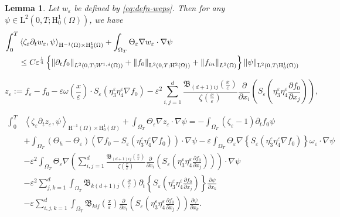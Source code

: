 \documentclass[10pt,a4paper]{amsart}
\newtheorem{lemma}{Lemma}
\newcommand{\eps}{\varepsilon}
\newcommand{\xeps}{\left(\frac{x}{\varepsilon}\right)}
\begin{document}
\begin{lemma}\label{lem:wkform-bound}
Let $w_\eps$ be defined by \eqref{eq:defn-weps}. Then for any $\psi\in\mathrm L^2(0,T;\mathrm H^1_0(\Omega))$, we have
\begin{equation}\label{eq:wkform-bound}
\begin{aligned}
\int_0^T & \left\langle \zeta_\eps\partial_{t}w_{\varepsilon},\psi \right\rangle_{\mathrm{H}^{-1}(\Omega) \times \mathrm{H}_0^1(\Omega)} 
+ \int_{\Omega_T} \Theta_\eps\nabla w_{\varepsilon} \cdot \nabla \psi 
\\
& \le C \eps^{\frac14} \left\{ \left\Vert \partial_tf_0\right\Vert_{L^2(0,T;W^{1,d}(\Omega))} + \left\Vert f_0\right\Vert_{\mathrm L^2(0,T;\mathrm H^2(\Omega))} + \left\Vert f_{{\rm{in}}}\right\Vert_{L^2(\Omega)} \right\}
\left\Vert \psi\right\Vert_{\mathrm L^2(0,T;\mathrm H^1_0(\Omega))}
\end{aligned}
\end{equation}
 \end{lemma}

\begin{equation}\label{eq:defn-zeps}
z_\eps := f_\eps - f_0 
- \eps \omega\left(\frac{x}{\eps}\right)\cdot S_\eps \left( \eta_3^\eps \eta_4^\eps \nabla f_0 \right)
- \eps^2 \sum_{i,j=1}^d \frac{\mathfrak{B}_{(d+1)ij}\xeps}{\zeta\xeps} \frac{\partial}{\partial x_i} \left(S_\eps \left( \eta_3^\eps \eta_4^\eps \frac{\partial f_0}{\partial x_j}\right)\right),
\end{equation}

\begin{equation}\label{eq:wk-form-2}
\begin{aligned}
\int_0^T & \left\langle \zeta_\eps\partial_{t}z_{\varepsilon},\psi \right\rangle_{\mathrm{H}^{-1}(\Omega) \times \mathrm{H}_0^1(\Omega)} 
+ \int_{\Omega_T} \Theta_\eps\nabla z_{\varepsilon} \cdot \nabla \psi
= - \int_{\Omega_T} (\zeta_\eps -1)\partial_{t}f_{0}\psi
\\
& 
+ \int_{\Omega_T}\left(\Theta_h - \Theta_\eps\right) \left( \nabla f_0 - S_\eps \left( \eta_3^\eps \eta_4^\eps \nabla f_0 \right) \right) \cdot \nabla \psi
- \eps \int_{\Omega_T} \Theta_\eps \nabla \left\{S_\eps \left( \eta_3^\eps \eta_4^\eps \nabla f_0 \right)\right\} \omega_\eps \cdot \nabla \psi
\\
&- \eps^2 \int_{\Omega_T} \Theta_\eps\nabla \left(\sum_{i,j=1}^d \frac{\mathfrak{B}_{(d+1)ij}\xeps}{\zeta\xeps} \frac{\partial}{\partial x_i} \left(S_\eps \left( \eta_3^\eps \eta_4^\eps \frac{\partial f_0}{\partial x_j}\right)\right)\right) \cdot \nabla \psi
\\
& - \eps^2 \sum_{j,k=1}^d \int_{\Omega_T} \mathfrak{B}_{k(d+1)j}\xeps \partial_t \left\{S_\eps \left( \eta_3^\eps \eta_4^\eps \frac{\partial f_0}{\partial x_j} \right)\right\} \frac{\partial\psi}{\partial x_k}
\\
& - \eps \sum_{i,j,k=1}^d \int_{\Omega_T} \mathfrak{B}_{kij}\xeps \frac{\partial}{\partial x_i} \left( S_\eps \left( \eta_3^\eps \eta_4^\eps \frac{\partial f_0}{\partial x_j} \right)\right) \frac{\partial\psi}{\partial x_k}.
\end{aligned}
\end{equation}
\end{document}
